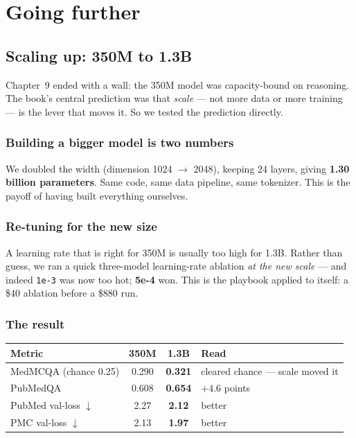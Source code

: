 \part{Going further}

\chapter{Scaling up: 350M to 1.3B}

Chapter~9 ended with a wall: the 350M model was capacity-bound on reasoning. The book's central prediction was
that \emph{scale} --- not more data or more training --- is the lever that moves it. So we tested the
prediction directly.

\section{Building a bigger model is two numbers}
We doubled the width (dimension 1024 $\rightarrow$ 2048), keeping 24 layers, giving \textbf{1.30 billion
parameters}. Same code, same data pipeline, same tokenizer. This is the payoff of having built everything
ourselves.

\section{Re-tuning for the new size}
A learning rate that is right for 350M is usually too high for 1.3B. Rather than guess, we ran a quick
three-model learning-rate ablation \emph{at the new scale} --- and indeed \texttt{1e-3} was now too hot;
\textbf{5e-4} won. This is the playbook applied to itself: a \$40 ablation before a \$880 run.

\section{The result}

\begin{center}\small
\begin{tabular}{@{}lccl@{}}
\toprule
\textbf{Metric} & \textbf{350M} & \textbf{1.3B} & \textbf{Read}\\
\midrule
MedMCQA (chance 0.25) & 0.290 & \textbf{0.321} & cleared chance --- scale moved it\\
PubMedQA & 0.608 & \textbf{0.654} & $+4.6$ points\\
PubMed val-loss $\downarrow$ & 2.27 & \textbf{2.12} & better\\
PMC val-loss $\downarrow$ & 2.13 & \textbf{1.97} & better\\
\bottomrule
\end{tabular}
\end{center}

